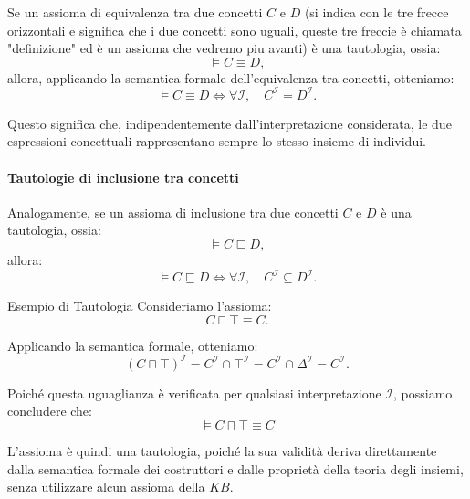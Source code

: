 Se un assioma di equivalenza tra due concetti $C$ e $D$ (si indica con le tre frecce orizzontali e significa che i due concetti sono uguali, queste tre freccie è chiamata "definizione" ed è un assioma che vedremo piu avanti)
è una tautologia, ossia:
\[
    \models C \equiv D,
\]
allora, applicando la semantica formale dell'equivalenza
tra concetti, otteniamo:
\[
    \models C \equiv D
    \iff
    \forall \mathcal{I}, \quad
    C^{\mathcal{I}} = D^{\mathcal{I}}.
\]

Questo significa che, indipendentemente dall'interpretazione
considerata, le due espressioni concettuali rappresentano
sempre lo stesso insieme di individui.

\paragraph{Tautologie di inclusione tra concetti}

Analogamente, se un assioma di inclusione tra due concetti
$C$ e $D$ è una tautologia, ossia:
\[
    \models C \sqsubseteq D,
\]
allora:
\[
    \models C \sqsubseteq D
    \iff
    \forall \mathcal{I}, \quad
    C^{\mathcal{I}} \subseteq D^{\mathcal{I}}.
\]

\begin{example}{Esempio di Tautologia}
Consideriamo l'assioma:
\[
    C \sqcap \top \equiv C.
\]

Applicando la semantica formale, otteniamo:
\[
    (C \sqcap \top)^{\mathcal{I}}
    = C^{\mathcal{I}} \cap \top^{\mathcal{I}}
    = C^{\mathcal{I}} \cap \Delta^{\mathcal{I}}
    = C^{\mathcal{I}}.
\]

Poiché questa uguaglianza è verificata per qualsiasi
interpretazione $\mathcal{I}$, possiamo concludere che:
\[
    \boxed{\models C \sqcap \top \equiv C}
\]

L'assioma è quindi una tautologia, poiché la sua validità
deriva direttamente dalla semantica formale dei costruttori
e dalle proprietà della teoria degli insiemi, senza
utilizzare alcun assioma della $KB$.        
\end{example}


